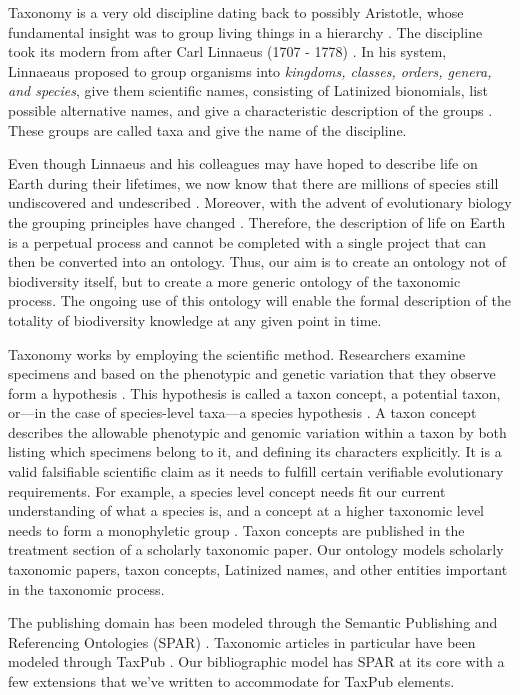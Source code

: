\documentclass{bmcart}
\begin{document}
Taxonomy is a very old discipline dating back to possibly Aristotle, whose fundamental insight was to group living things in a hierarchy \cite{manktelow_history_2010}. The discipline took its modern from after Carl Linnaeus (1707 - 1778) \cite{manktelow_history_2010}. In his system, Linnaeaus proposed to group organisms into \emph{kingdoms, classes, orders, genera, and species}, give them scientific names, consisting of Latinized bionomials, list possible alternative names, and give a characteristic description of the groups \cite{bhl10277}. These groups are called taxa and give the name of the discipline.

Even though Linnaeus and his colleagues may have hoped to describe life on Earth during their lifetimes, we now know that there are millions of species still undiscovered and undescribed \cite{ratnasingham_dna-based_2013}. Moreover, with the advent of evolutionary biology the grouping principles have changed \cite{mallet_species_2001}. Therefore, the description of life on Earth is a perpetual process and cannot be completed with a single project that can then be converted into an ontology. Thus, our aim is to create an ontology not of biodiversity itself, but to create a more generic ontology of the taxonomic process. The ongoing use of this ontology will enable the formal description of the totality of biodiversity knowledge at any given point in time.

Taxonomy works by employing the scientific method. Researchers examine specimens and based on the phenotypic and genetic variation that they observe form a hypothesis \cite{deans_time_2012}. This hypothesis is called a taxon concept, a potential taxon, or---in the case of species-level taxa---a species hypothesis \cite{berendsohn_concept_1995}. A taxon concept describes the allowable phenotypic and genomic variation within a taxon by both listing which specimens belong to it, and defining its characters explicitly. It is a valid falsifiable scientific claim as it needs to fulfill certain verifiable evolutionary requirements. For example, a species level concept needs fit our current understanding of what a species is, and a concept at a higher taxonomic level needs to form a monophyletic group \cite{mallet_species_2001}. Taxon concepts are published in the treatment section \cite{catapano_taxpub:_2010} of a scholarly taxonomic paper. Our ontology models scholarly taxonomic papers, taxon concepts, Latinized names, and other entities important in the taxonomic process.

The publishing domain has been modeled through the Semantic Publishing and Referencing Ontologies (SPAR) \cite{peroni_semantic_2014}. Taxonomic articles in particular have been modeled through TaxPub \cite{catapano_taxpub:_2010}. Our bibliographic model has SPAR at its core with a few extensions that we've written to accommodate for TaxPub elements.
\end{document}
